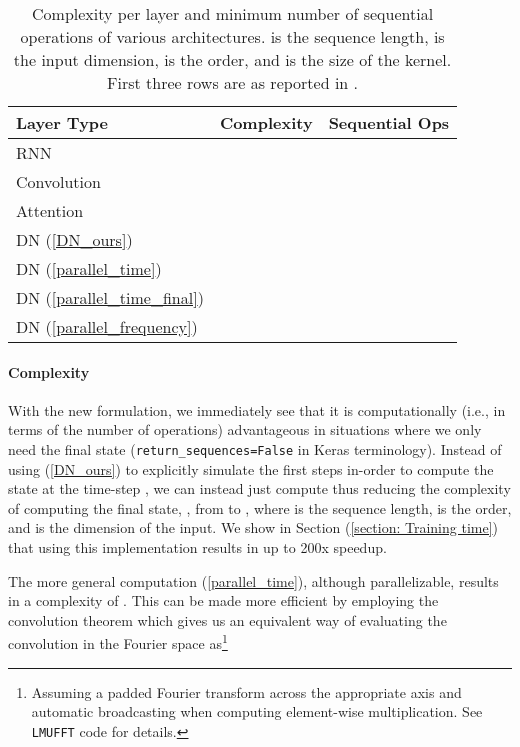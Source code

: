 \documentclass{article}
\begin{document}
\begin{table}
\caption{Complexity per layer and minimum number of sequential operations of various architectures.  is the sequence length,  is the input dimension,  is the order, and  is the size of the kernel. First three rows are as reported in \citet{vaswani2017attention}.}
\label{table:complexity}
\begin{center}
\begin{tabular}{lcc}
\hline\noalign{\smallskip}
Layer Type & Complexity & Sequential Ops \\
\hline\noalign{\smallskip}
RNN &  &  \\
Convolution &  &   \\
Attention &  &  \\
\hline\noalign{\smallskip}
DN (\ref{DN_ours}) &   & \\
DN (\ref{parallel_time}) &   & \\
DN (\ref{parallel_time_final}) &   & \\
DN (\ref{parallel_frequency}) &    &  \\
\hline
\end{tabular}
\end{center}
\end{table}

\paragraph{Complexity} With the new formulation, we immediately see that it is computationally (i.e., in terms of the number of operations) advantageous in situations where we only need the final state (\verb|return_sequences=False| in Keras terminology). Instead of using (\ref{DN_ours}) to explicitly simulate the first  steps in-order to compute the state at the time-step , we can instead just compute 
thus reducing the complexity of computing the final state, , from  to , where  is the sequence length,  is the order, and  is the dimension of the input.  We show in Section (\ref{section: Training time}) that using this implementation results in up to 200x speedup.

The more general computation (\ref{parallel_time}), although parallelizable, results in a complexity of . This can be made more efficient by employing the convolution theorem which gives us an equivalent way of evaluating the convolution in the Fourier space as\footnote{Assuming a padded Fourier transform across the appropriate axis and automatic broadcasting when computing element-wise multiplication. See \texttt{LMUFFT} code for  details.}
\end{document}
